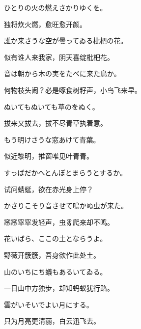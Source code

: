 \begin{haiku}
    {\FH ひとりの火の燃えさかりゆくを。}

    {\FK 独将炊火燃，愈旺愈开颜。}
\end{haiku}

\begin{haiku}
    {\FH 誰か来さうな空が曇ってゐる枇杷の花。}

    {\FK 似有谁人来我家，阴天喜绽枇杷花。}
\end{haiku}

\begin{haiku}
    {\FH 音は朝から木の実をたべに来た鳥か。}

    {\FK 何物枝头闹？必是啄食树籽声，小鸟飞来早。}
\end{haiku}

\begin{haiku}
    {\FH ぬいてもぬいても草のをぬく。}

    {\FK 拔来又拔去，拔不尽青草执着意。}
\end{haiku}

\begin{haiku}
    {\FH もう明けさうな窓あけて青葉。}

    {\FK 似近黎明，推窗唯见叶青青。}
\end{haiku}

\begin{haiku}
    {\FH すっばだかへとんぼとまらうとするか。}

    {\FK 试问蜻蜓，欲在赤光身上停？}
\end{haiku}

\begin{haiku}
    {\FH かさりこそり音させて鳴かぬ虫が来た。}

    {\FK 窸窸窣窣发轻声，虫豸爬来却不鸣。}
\end{haiku}

\begin{haiku}
    {\FH 花いばら、ここの土とならうよ。}

    {\FK 野薇开簇簇，吾身欲作此处土。}
\end{haiku}

\begin{haiku}
    {\FH 山のいちにち蟻もあるいてゐる。}

    {\FK 一日山中方独步，却知蚂蚁犹行路。}
\end{haiku}

\begin{haiku}
    {\FH 雲がいそいでよい月にする。}

    {\FK 只为月亮更清丽，白云迅飞去。}
\end{haiku}

